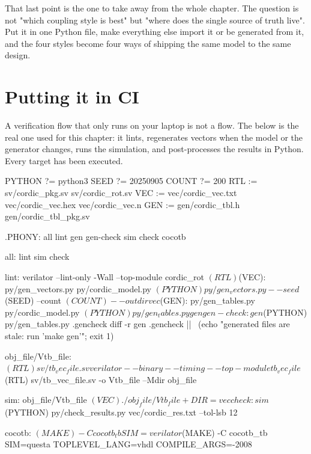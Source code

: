 That last point is the one to take away from the whole chapter. The question
is not "which coupling style is best" but "where does the single source of
truth live". Put it in one Python file, make everything else import it or be
generated from it, and the four styles become four ways of shipping the same
model to the same design.

\section{Putting it in CI}
\label{sec:python:ci}

A verification flow that only runs on your laptop is not a flow. The
 below is the real one used for this chapter: it lints,
regenerates vectors when the model or the generator changes, runs the
simulation, and post-processes the results in Python. Every target has been
executed.

\begin{makecode}
PYTHON ?= python3
SEED   ?= 20250905
COUNT  ?= 200
RTL    := sv/cordic_pkg.sv sv/cordic_rot.sv
VEC    := vec/cordic_vec.txt vec/cordic_vec.hex vec/cordic_vec.n
GEN    := gen/cordic_tbl.h gen/cordic_tbl_pkg.sv

.PHONY: all lint gen gen-check sim check cocotb

all: lint sim check

lint:
	verilator --lint-only -Wall --top-module cordic_rot $(RTL)

$(VEC): py/gen_vectors.py py/cordic_model.py
	$(PYTHON) py/gen_vectors.py --seed $(SEED) --count $(COUNT) --outdir vec

$(GEN): py/gen_tables.py py/cordic_model.py
	$(PYTHON) py/gen_tables.py gen

gen-check: gen
	$(PYTHON) py/gen_tables.py .gencheck
	diff -r gen .gencheck || \
	  (echo "generated files are stale: run 'make gen'"; exit 1)

obj_file/Vtb_file: $(RTL) sv/tb_vec_file.sv
	verilator --binary --timing --top-module tb_vec_file \
	  $(RTL) sv/tb_vec_file.sv -o Vtb_file --Mdir obj_file

sim: obj_file/Vtb_file $(VEC)
	./obj_file/Vtb_file +DIR=vec

check: sim
	$(PYTHON) py/check_results.py vec/cordic_res.txt --tol-lsb 12

cocotb:
	$(MAKE) -C cocotb_tb SIM=verilator
	$(MAKE) -C cocotb_tb SIM=questa TOPLEVEL_LANG=vhdl COMPILE_ARGS=-2008
\end{makecode}

